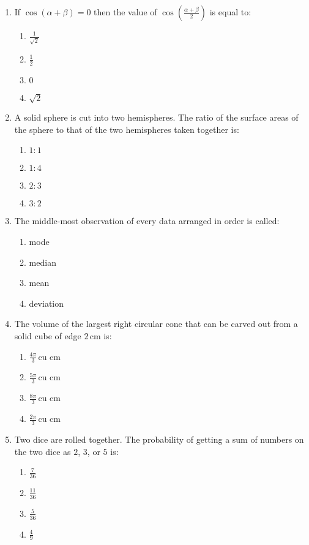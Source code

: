 \documentclass[12pt,-letter paper]{article}
\begin{document}
\begin{enumerate}
\item If $\cos(\alpha + \beta) = 0$ then the value of $\cos\left(\frac{\alpha + \beta}{2}\right)$ is equal to:
    \begin{enumerate}
    \item $\frac{1}{\sqrt{2}}$
    \item $\frac{1}{2}$
    \item $0$
    \item $\sqrt{2}$
    \end{enumerate}
\newpage
\item A solid sphere is cut into two hemispheres. The ratio of the surface areas of the sphere to that of the two hemispheres taken together is:
	\begin{enumerate}    
\item $1:1$
    \item $1:4$
    \item $2:3$
    \item $3:2$
	\end{enumerate}
\item The middle-most observation of every data arranged in order is called:
	\begin{enumerate}    
\item mode
    \item median
    \item mean
    \item deviation
\end{enumerate}
\item The volume of the largest right circular cone that can be carved out from a solid cube of edge $2 \, \text{cm}$ is:
	\begin{enumerate}    
\item $\frac{4\pi}{3} \, \text{cu cm}$
    \item $\frac{5\pi}{3} \, \text{cu cm}$
    \item $\frac{8\pi}{3} \, \text{cu cm}$
    \item $\frac{2\pi}{3} \, \text{cu cm}$
	\end{enumerate}
\item Two dice are rolled together. The probability of getting a sum of numbers on the two dice as $2$, $3$, or $5$ is:
	\begin{enumerate}    
\item $\frac{7}{36}$
    \item $\frac{11}{36}$
    \item $\frac{5}{36}$
    \item $\frac{4}{9}$

\end{enumerate}
\end{enumerate}
\end{document}
